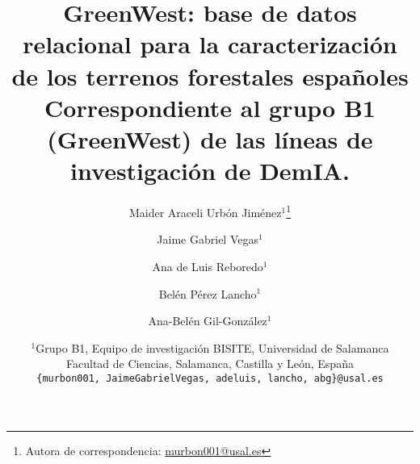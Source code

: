 \documentclass[11pt,a4paper]{article}
\title{\textbf{GreenWest: base de datos relacional para la caracterización de los terrenos forestales españoles}\\[4pt]
\small{Correspondiente al grupo B1 (GreenWest) de las líneas de investigación de DemIA.}}
\author{
Maider Araceli Urbón Jiménez$^{1}$\thanks{Autora de correspondencia: \href{mailto:murbon001@usal.es}{murbon001@usal.es}} \and
Jaime Gabriel Vegas$^{1}$ \and
Ana de Luis Reboredo$^{1}$ \and
Belén Pérez Lancho$^{1}$ \and
Ana-Belén Gil-González$^{1}$}
\date{
\small
$^{1}$Grupo B1, Equipo de investigación BISITE, Universidad de Salamanca\\
Facultad de Ciencias, Salamanca, Castilla y León, España\\[4pt]
\texttt{\{murbon001, JaimeGabrielVegas, adeluis, lancho, abg\}@usal.es}
}
\begin{document}
\maketitle


\begin{abstract}

\end{abstract}




\newpage


\newpage


\newpage


\newpage


\newpage


\newpage


\newpage


% 
\printbibliography

\newpage

\end{document}
